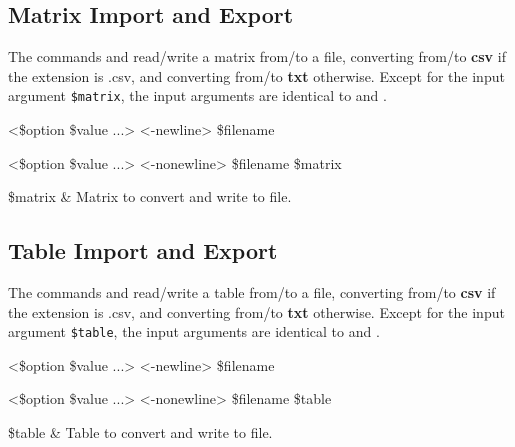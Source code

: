 \subsection{Matrix Import and Export}
The commands  and  read/write a matrix from/to a file, converting from/to \textbf{csv} if the extension is .csv, and converting from/to \textbf{txt} otherwise.
Except for the input argument \texttt{\$matrix}, the input arguments are identical to  and .
\begin{syntax}
 <\$option \$value ...> <-newline> \$filename
\end{syntax}
\begin{syntax}
 <\$option \$value ...> <-nonewline> \$filename \$matrix
\end{syntax}
\begin{args}
\$matrix & Matrix to convert and write to file.
\end{args}
\subsection{Table Import and Export}
The commands  and  read/write a table from/to a file, converting from/to \textbf{csv} if the extension is .csv, and converting from/to \textbf{txt} otherwise.
Except for the input argument \texttt{\$table}, the input arguments are identical to  and .
\begin{syntax}
 <\$option \$value ...> <-newline> \$filename
\end{syntax}
\begin{syntax}
 <\$option \$value ...> <-nonewline> \$filename \$table
\end{syntax}
\begin{args}
\$table & Table to convert and write to file.
\end{args}
\clearpage





